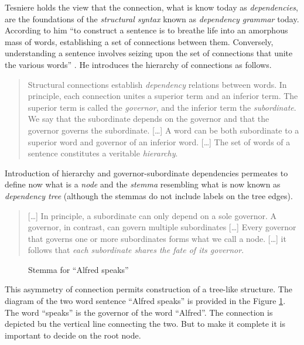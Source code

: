 Tesniere holds the view that the connection, what is know today as \textit{dependencies}, are the foundations of the \textit{structural syntax} known as \textit{dependency grammar} today. According to him ``to construct a sentence is to breathe life into an amorphous mass of words, establishing a set of connections between them. Conversely, understanding a sentence involves seizing upon the set of connections that unite the various words'' \citep[4]{Tesniere2015}. He introduces the hierarchy of connections as follows. 

\begin{quotation}
    Structural connections establish \textit{dependency} relations between words. In principle, each connection unites a superior term and an inferior term. The superior term is called the \textit{governor}, and the inferior term the \textit{subordinate}. We say that the subordinate depends on the governor and that the governor governs the subordinate. [\dots] A word can be both subordinate to a superior word and governor of an inferior word. [\dots] The set of words of a sentence constitutes a veritable \textit{hierarchy}. \citep[5--6]{Tesniere2015}
\end{quotation}

Introduction of hierarchy and governor-subordinate dependencies permeates to define now what is a \textit{node} and the \textit{stemma} resembling what is now known as \textit{dependency tree} (although the stemmas do not include labels on the tree edges). 

\begin{quotation}
    [\dots] In principle, a subordinate can only depend on a sole governor. A governor, in contrast, can govern multiple subordinates [\dots] Every governor that governs one or more subordinates forms what we call a node. [\dots] it follows that \textit{each subordinate shares the fate of its governor}. \citep[6]{Tesniere2015}
\end{quotation}

\begin{figure}[!ht]
    \centering
    \caption{Stemma for ``Alfred speaks''}
    \label{fig:stemma1}
\end{figure}

This asymmetry of connection permits construction of a tree-like structure. The diagram of the two word sentence ``Alfred speaks'' is provided in the Figure \ref{fig:stemma1}. The word ``speaks'' is the governor of the word ``Alfred''. The connection is depicted bu the vertical line connecting the two. But to make it complete it is important to decide on the root node. 

